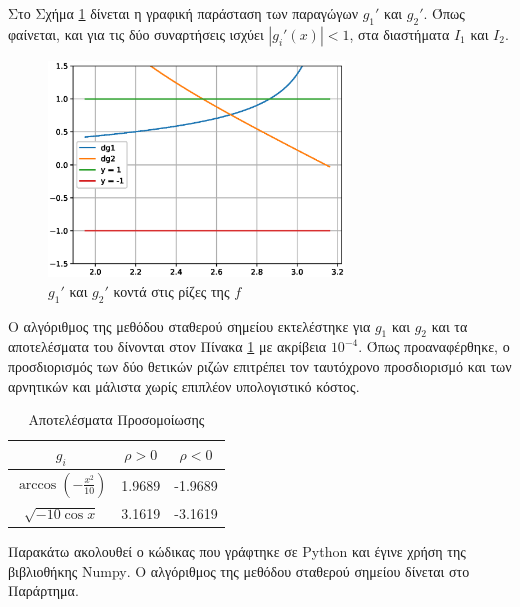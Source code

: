 \documentclass[assignment2.tex]{subfiles}
\begin{document}
Στο Σχήμα \ref{fig:dg1_dg2} δίνεται η γραφική παράσταση των παραγώγων $g_1'$ και $g_2'$. Όπως φαίνεται, και για τις δύο συναρτήσεις ισχύει $|g_i'(x)|<1$, στα διαστήματα $I_1$ και $I_2$.
\begin{figure}[hp]
\includegraphics[width=0.7\textwidth]{dg1_dg2.eps}
\centering
\caption{$g_1'$ και $g_2'$ κοντά στις ρίζες της $f$}
\label{fig:dg1_dg2}
\end{figure} 

Ο αλγόριθμος της μεθόδου σταθερού σημείου εκτελέστηκε για $g_1$ και $g_2$ και τα αποτελέσματα του δίνονται στον Πίνακα \ref{table:fixed_point} με ακρίβεια $10^{-4}$. Όπως προαναφέρθηκε, ο προσδιορισμός των δύο θετικών ριζών επιτρέπει τον ταυτόχρονο προσδιορισμό και των αρνητικών και μάλιστα χωρίς επιπλέον υπολογιστικό κόστος.

\begin{table}[ht]
\centering
\begin{tabular}{||c c c||} 
	\hline
	$g_i$& $\rho>0$ & $\rho<0$ \\ [0.5ex] 
	\hline\hline
	$\arccos \left(-\frac{x^2}{10}\right)$ & 1.9689 & -1.9689 \\ 
	\hline
	$\sqrt{-10\cos x}$ & 3.1619 & -3.1619 \\ [1ex] 
	\hline
\end{tabular}
\caption{Αποτελέσματα Προσομοίωσης}
\label{table:fixed_point}
\end{table}

Παρακάτω ακολουθεί ο κώδικας που γράφτηκε σε \textlatin{Python} και έγινε χρήση της βιβλιοθήκης \textlatin{Numpy}. Ο αλγόριθμος της μεθόδου σταθερού σημείου δίνεται στο Παράρτημα.

\end{document}
